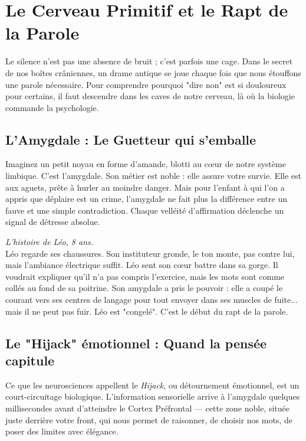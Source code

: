 \chapter{Le Cerveau Primitif et le Rapt de la Parole}

Le silence n'est pas une absence de bruit ; c'est parfois une cage. Dans le secret de nos boîtes crâniennes, un drame antique se joue chaque fois que nous étouffons une parole nécessaire. Pour comprendre pourquoi "dire non" est si douloureux pour certains, il faut descendre dans les caves de notre cerveau, là où la biologie commande la psychologie.

\section{L'Amygdale : Le Guetteur qui s'emballe}
Imaginez un petit noyau en forme d'amande, blotti au cœur de notre système limbique. C'est l'amygdale. Son métier est noble : elle assure votre survie. Elle est aux aguets, prête à hurler au moindre danger. Mais pour l'enfant à qui l'on a appris que déplaire est un crime, l'amygdale ne fait plus la différence entre un fauve et une simple contradiction. Chaque velléité d'affirmation déclenche un signal de détresse absolue.

\begin{FocusHumain}
\textit{L'histoire de Léo, 8 ans.} \\
Léo regarde ses chaussures. Son instituteur gronde, le ton monte, pas contre lui, mais l'ambiance électrique suffit. Léo sent son cœur battre dans sa gorge. Il voudrait expliquer qu'il n'a pas compris l'exercice, mais les mots sont comme collés au fond de sa poitrine. Son amygdale a pris le pouvoir : elle a coupé le courant vers ses centres de langage pour tout envoyer dans ses muscles de fuite... mais il ne peut pas fuir. Léo est "congelé". C'est le début du rapt de la parole.
\end{FocusHumain}

\section{Le "Hijack" émotionnel : Quand la pensée capitule}
Ce que les neurosciences appellent le \textit{Hijack}, ou détournement émotionnel, est un court-circuitage biologique. L'information sensorielle arrive à l'amygdale quelques millisecondes avant d'atteindre le Cortex Préfrontal — cette zone noble, située juste derrière votre front, qui nous permet de raisonner, de choisir nos mots, de poser des limites avec élégance.

